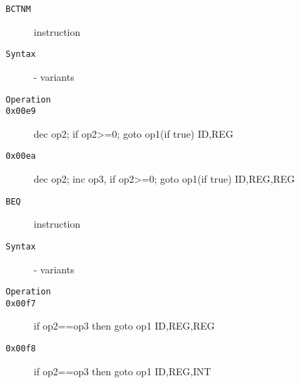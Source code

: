 \clearpage
\begin{description}
\item[\texttt{BCTNM}] instruction\\
\item[\texttt{Syntax}] - variants\\

\item[\texttt{Operation}]
\item[\texttt{}]
\item[\texttt{0x00e9}] dec op2; if op2>=0; goto op1(if true)  {ID,REG}            \\
\item[\texttt{0x00ea}] dec op2; inc op3, if op2>=0; goto op1(if true)  {ID,REG,REG}        \\
\end{description}
\clearpage
\begin{description}
\item[\texttt{BEQ}] instruction\\
\item[\texttt{Syntax}] - variants\\

\item[\texttt{Operation}]
\item[\texttt{}]
\item[\texttt{0x00f7}] if op2==op3 then goto op1  {ID,REG,REG}        \\
\item[\texttt{0x00f8}] if op2==op3 then goto op1  {ID,REG,INT}        \\
\end{description}
\clearpage
